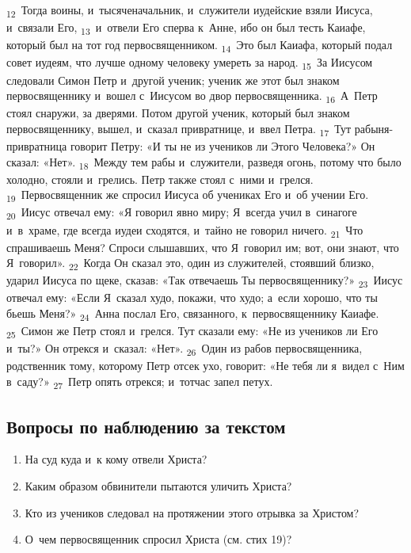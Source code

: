 \documentclass[a4paper,12pt]{article}
\begin{document}
\textsubscript{12}~Тогда воины, и~тысяченачальник, и~служители иудейские взяли Иисуса, и~связали Его, \textsubscript{13}~и~отвели Его сперва к~Анне, ибо он был тесть Каиафе, который был на тот год первосвященником. \textsubscript{14}~Это был Каиафа, который подал совет иудеям, что лучше одному человеку умереть за народ. \textsubscript{15}~За Иисусом следовали Симон Петр и~другой ученик; ученик же этот был знаком первосвященнику и~вошел с~Иисусом во двор первосвященника. \textsubscript{16}~А~Петр стоял снаружи, за дверями. Потом другой ученик, который был знаком первосвященнику, вышел, и~сказал привратнице, и~ввел Петра. \textsubscript{17}~Тут рабыня-привратница говорит Петру: «И ты не из учеников ли Этого Человека?» Он сказал: «Нет». \textsubscript{18}~Между тем рабы и~служители, разведя огонь, потому что было холодно, стояли и~грелись. Петр также стоял с~ними и~грелся. \textsubscript{19}~Первосвященник же спросил Иисуса об учениках Его и~об учении Его. \textsubscript{20}~Иисус отвечал ему: «Я говорил явно миру; Я~всегда учил в~синагоге и~в~храме, где всегда иудеи сходятся, и~тайно не говорил ничего. \textsubscript{21}~Что спрашиваешь Меня? Спроси слышавших, что Я~говорил им; вот, они знают, что Я~говорил». \textsubscript{22}~Когда Он сказал это, один из служителей, стоявший близко, ударил Иисуса по щеке, сказав: «Так отвечаешь Ты первосвященнику?» \textsubscript{23}~Иисус отвечал ему: «Если Я~сказал худо, покажи, что худо; а~если хорошо, что ты бьешь Меня?» \textsubscript{24}~Анна послал Его, связанного, к~первосвященнику Каиафе. \textsubscript{25}~Симон же Петр стоял и~грелся. Тут сказали ему: «Не из учеников ли Его и~ты?» Он отрекся и~сказал: «Нет». \textsubscript{26}~Один из рабов первосвященника, родственник тому, которому Петр отсек ухо, говорит: «Не тебя ли я~видел с~Ним в~саду?» \textsubscript{27}~Петр опять отрекся; и~тотчас запел петух. 

\subsection*{Вопросы по наблюдению за текстом}
\begin{enumerate}
    \item На суд куда и~к кому отвели Христа? 
    
    \myline
    
    \myline
    \item Каким образом обвинители пытаются уличить Христа? 
    
    \myline
    
    \myline
    \item Кто из учеников следовал на протяжении этого отрывка за Христом? 
    
    \myline
    
    \myline
    \item О~чем первосвященник спросил Христа (см. стих 19)? 
    
    \myline
    
    \myline
\end{enumerate}
\end{document}
